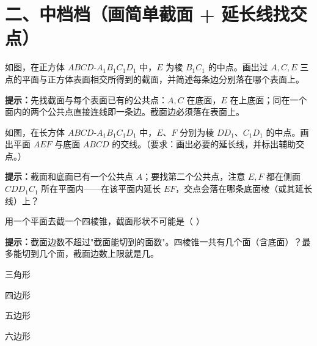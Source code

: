 \documentclass{exam-zh}
\begin{document}
\section*{二、中档档（画简单截面 + 延长线找交点）}


\begin{problem}[points=9]
    如图，在正方体 $ABCD\text{-}A_1B_1C_1D_1$ 中，$E$ 为棱 $B_1C_1$ 的中点。画出过 $A,C,E$ 三点的平面与正方体表面相交所得到的截面，并简述每条边分别落在哪个表面上。

    \begin{hintbox}
\textbf{提示：}先找截面与每个表面已有的公共点：$A,C$ 在底面，$E$ 在上底面；同在一个面内的两个公共点直接连线即一条边。截面边必须落在表面上。\end{hintbox}

  \answerarea[52mm]
\end{problem}



\begin{problem}[points=10]
    如图，在长方体 $ABCD\text{-}A_1B_1C_1D_1$ 中，$E$、$F$ 分别为棱 $DD_1$、$C_1D_1$ 的中点。画出平面 $AEF$ 与底面 $ABCD$ 的交线。（要求：画出必要的延长线，并标出辅助交点。）

    \begin{hintbox}
\textbf{提示：}截面和底面已有一个公共点 $A$；要找第二个公共点，注意 $E,F$ 都在侧面 $CDD_1C_1$ 所在平面内——在该平面内延长 $EF$，交点会落在哪条底面棱（或其延长线）上？\end{hintbox}

  \answerarea[60mm]
\end{problem}



\begin{question}[points=6]
  用一个平面去截一个四棱锥，截面形状不可能是（    ）
  \begin{hintbox}
\textbf{提示：}截面边数不超过"截面能切到的面数"。四棱锥一共有几个面（含底面）？最多能切到几个面，截面边数上限就是几。\end{hintbox}

  \begin{choices}
    \item 三角形
    \item 四边形
    \item 五边形
    \item 六边形
  \end{choices}
\end{question}
\end{document}
